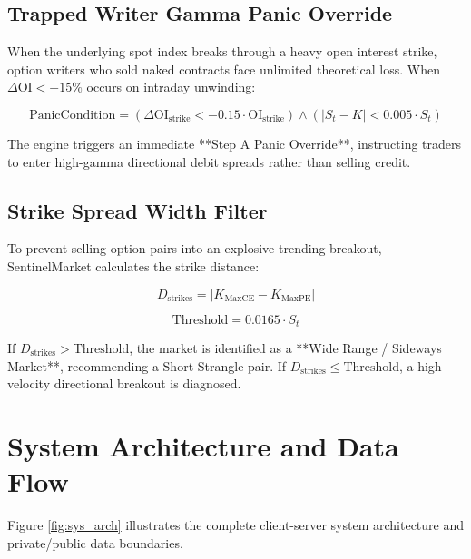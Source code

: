 \subsection{Trapped Writer Gamma Panic Override}
When the underlying spot index breaks through a heavy open interest strike, option writers who sold naked contracts face unlimited theoretical loss. When $\Delta \text{OI} < -15\%$ occurs on intraday unwinding:

\begin{equation}
\text{PanicCondition} = \left( \Delta \text{OI}_{\text{strike}} < -0.15 \cdot \text{OI}_{\text{strike}} \right) \land \left( |S_t - K| < 0.005 \cdot S_t \right)
\end{equation}

The engine triggers an immediate **Step A Panic Override**, instructing traders to enter high-gamma directional debit spreads rather than selling credit.

\subsection{Strike Spread Width Filter}
To prevent selling option pairs into an explosive trending breakout, SentinelMarket calculates the strike distance:

\begin{equation}
D_{\text{strikes}} = |K_{\text{MaxCE}} - K_{\text{MaxPE}}|
\end{equation}

\begin{equation}
\text{Threshold} = 0.0165 \cdot S_t
\end{equation}

If $D_{\text{strikes}} > \text{Threshold}$, the market is identified as a **Wide Range / Sideways Market**, recommending a Short Strangle pair. If $D_{\text{strikes}} \le \text{Threshold}$, a high-velocity directional breakout is diagnosed.

\section{System Architecture and Data Flow}
Figure \ref{fig:sys_arch} illustrates the complete client-server system architecture and private/public data boundaries.

